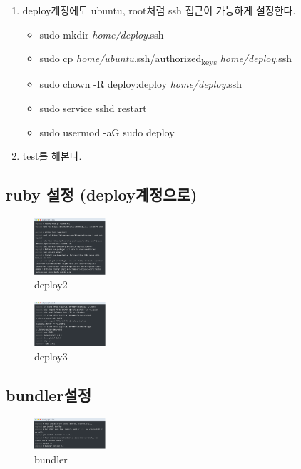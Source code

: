 \documentclass[11pt]{article}
\begin{document}
\begin{enumerate}
\item deploy계정에도 ubuntu, root처럼 ssh 접근이 가능하게 설정한다.
\begin{itemize}
\item sudo mkdir \emph{home/deploy}.ssh
\item sudo cp \emph{home/ubuntu}.ssh/authorized\textsubscript{keys} \emph{home/deploy}.ssh
\item sudo chown -R deploy:deploy \emph{home/deploy}.ssh
\item sudo service sshd restart
\item sudo usermod -aG sudo deploy
\end{itemize}

\item test를 해본다.
\end{enumerate}

\subsection{ruby 설정 (deploy계정으로)}
\label{sec:org8365a94}
\begin{figure}[htbp]
\centering
\includegraphics[width=100px]{./img/deploy2.png}
\caption{\label{fig:org6644f5f}deploy2}
\end{figure}

\begin{figure}[htbp]
\centering
\includegraphics[width=100px]{./img/deploy3.png}
\caption{\label{fig:orge79a7c0}deploy3}
\end{figure}

\subsection{bundler설정}
\label{sec:orgf121310}
\begin{figure}[htbp]
\centering
\includegraphics[width=100px]{./img/bundler.png}
\caption{\label{fig:orgcef5eab}bundler}
\end{figure}
\end{document}
